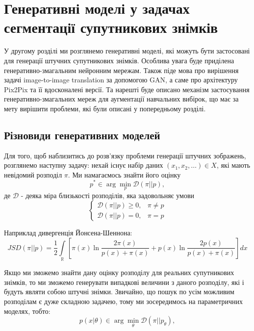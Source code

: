 \chapter{Генеративні моделі у задачах сегментації супутникових знімків}
\label{chap:gans}

У другому розділі ми розглянемо генеративні моделі, які можуть
бути застосовані для генерації штучних супутникових знімків.
Особлива увага буде приділена генеративно-змагальним нейронним
мережам. Також піде мова про вирішення задачі image-to-image translation
за допомогою GAN, а саме про архітектуру Pix2Pix та її вдосконалені версії.
Та нарешті буде описано механізм застосування генеративно-змагальних мереж
для аугментації навчальних вибірок, що має за мету вирішити проблеми, які
були описані у попередньому розділі.

\section{Різновиди генеративних моделей}

Для того, щоб наблизитись до розв'язку проблеми генерації
штучних зображень,
розглянемо наступну задачу:
нехай існує набір даних $(x_1, x_2, \dots) \in X$,
які мають невідомий розподіл $\pi$.
Ми намагаємось знайти його оцінку
$$p^* \in \arg \min\limits_{p} \mathcal{D}(\pi || p),$$
де $\mathcal{D}$ - деяка
міра близькості розподілів, яка задовольняє умови
\begin{equation*}
    \begin{cases}
        \mathcal{D}(\pi || p) \geq 0, & \pi \neq p \\
        \mathcal{D}(\pi || p) = 0,    & \pi = p
    \end{cases}
\end{equation*}

Наприклад дивергенція Йонсена-Шеннона:
\begin{equation} \label{eq:jsd}
    JSD(\pi || p) = \frac{1}{2} \int\limits_{\mathbb{R}}
    \left[
        \pi(x) \ln \frac{2\pi(x)}{p(x) + \pi(x)} +
        p(x) \ln \frac{2p(x)}{p(x) + \pi(x)}
        \right] dx
\end{equation}

Якщо ми зможемо знайти дану оцінку розподілу для
реальних супутникових знімків, то ми зможемо
генерувати випадкові величини з даного розподілу, які
і будуть являти собою штучні знімки. Звичайно, що
пошук по усім можливим розподілам є дуже складною задачею,
тому ми зосередимось на параметричних моделях, тобто:
$$p(x | \theta) \in \arg \min\limits_{\theta} \mathcal{D}(\pi || p_\theta),$$

